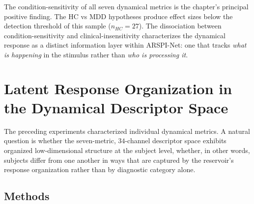 The condition-sensitivity of all seven dynamical metrics is the chapter's principal positive finding. The HC vs MDD hypotheses produce effect sizes below the detection threshold of this sample ($n_{HC} = 27$). The dissociation between condition-sensitivity and clinical-insensitivity characterizes the dynamical response as a distinct information layer within ARSPI-Net: one that tracks \emph{what is happening} in the stimulus rather than \emph{who is processing it}.


\section{Latent Response Organization in the Dynamical Descriptor Space}
\label{sec:ch6_latent_axis}

The preceding experiments characterized individual dynamical metrics. A natural question is whether the seven-metric, $34$-channel descriptor space exhibits organized low-dimensional structure at the subject level, whether, in other words, subjects differ from one another in ways that are captured by the reservoir's response organization rather than by diagnostic category alone.

\subsection{Methods}

